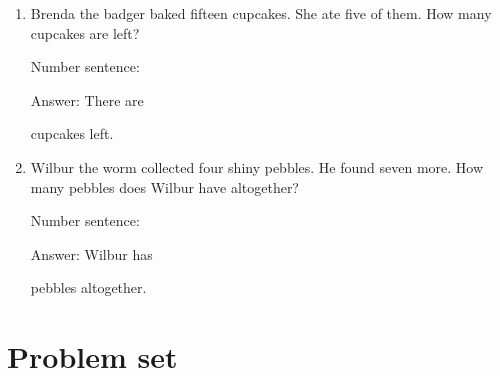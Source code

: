 \documentclass{tufte-book}
\begin{document}
\begin{enumerate}
\item
  Brenda the badger baked fifteen cupcakes. She ate five of them. How
  many cupcakes are left?\medskip\par
  Number sentence:
  \dotfill\medskip\par
  Answer: There are
  \dotfill\medskip\par\mbox{}\dotfill\medskip\par\mbox{}\dotfill\bigskip
  cupcakes left.
\item
  Wilbur the worm collected four shiny pebbles. He found seven more. How
  many pebbles does Wilbur have altogether?\medskip\par
  Number sentence:
  \dotfill\medskip\par
  Answer: Wilbur has
  \dotfill\medskip\par\mbox{}\dotfill\medskip\par\mbox{}\dotfill\bigskip
  pebbles altogether.
\end{enumerate}



\clearpage\section{Problem set }
\end{document}
